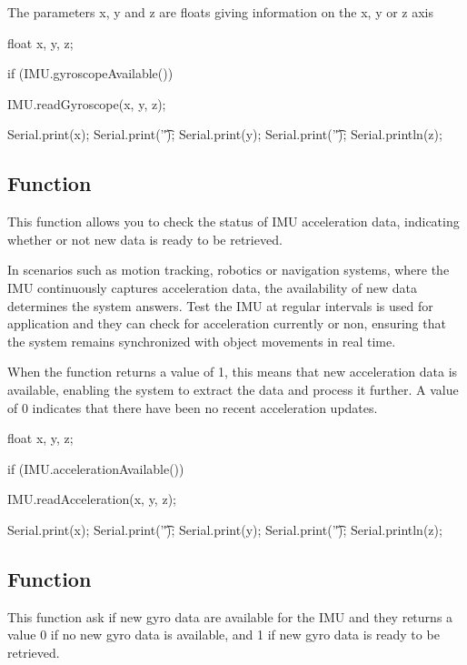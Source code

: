 The parameters x, y and z are floats giving information on the x, y or z axis 

\begin{Arduino}
    float x, y, z;
    
    if (IMU.gyroscopeAvailable()) {
        IMU.readGyroscope(x, y, z);
        
        Serial.print(x);
        Serial.print('\t');
        Serial.print(y);
        Serial.print('\t');
        Serial.println(z);	}
\end{Arduino}



\subsection{Function }

This function allows you to check the status of IMU acceleration data, indicating whether or not new data is ready to be retrieved.

In scenarios such as motion tracking, robotics or navigation systems, where the IMU continuously captures acceleration data, the availability of new data determines the system answers. Test the IMU at regular intervals is used for application and they can check for acceleration currently or non, ensuring that the system remains synchronized with object movements in real time.

When the function returns a value of 1, this means that new acceleration data is available, enabling the system to extract the data and process it further. A value of 0 indicates that there have been no recent acceleration updates.

\begin{Arduino}
    float x, y, z;
    
    if (IMU.accelerationAvailable()) {
        IMU.readAcceleration(x, y, z);
        
        Serial.print(x);
        Serial.print('\t');
        Serial.print(y);
        Serial.print('\t');
        Serial.println(z); }
    
\end{Arduino}


\subsection{Function }

This function ask if new gyro data are available for the IMU and they returns a value 0 if no new gyro data is available, and 1 if new gyro data is ready to be retrieved.

